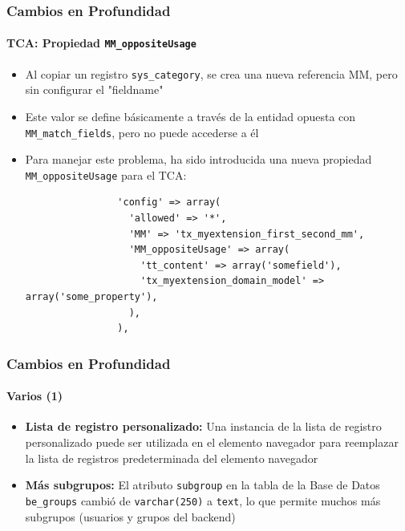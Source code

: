 \begin{frame}[fragile]
	\frametitle{Cambios en Profundidad}
	\framesubtitle{TCA: Propiedad \texttt{MM\_oppositeUsage}}

	\lstset{
		basicstyle=\tiny\ttfamily
	}

	\begin{itemize}
		\item Al copiar un registro \texttt{sys\_category}, se crea una nueva referencia MM, pero sin configurar el "fieldname"
		\item Este valor se define básicamente a través de la entidad opuesta con \texttt{MM\_match\_fields}, pero no puede accederse a él
		\item Para manejar este problema, ha sido introducida una nueva propiedad \texttt{MM\_oppositeUsage} para el TCA:

			\begin{lstlisting}
				'config' => array(
				  'allowed' => '*',
				  'MM' => 'tx_myextension_first_second_mm',
				  'MM_oppositeUsage' => array(
				    'tt_content' => array('somefield'),
				    'tx_myextension_domain_model' => array('some_property'),
				  ),
				),
			\end{lstlisting}

	\end{itemize}

\end{frame}


\begin{frame}[fragile]
	\frametitle{Cambios en Profundidad}
	\framesubtitle{Varios (1)}

	\begin{itemize}

		\item \textbf{Lista de registro personalizado:}\newline
			\small
				Una instancia de la lista de registro personalizado puede ser utilizada en el elemento navegador para reemplazar la lista de registros predeterminada del elemento navegador
			\normalsize

		\item \textbf{Más subgrupos:}\newline
			\small
				El atributo \texttt{subgroup} en la tabla de la Base de Datos \texttt{be\_groups} cambió de \texttt{varchar(250)} a \texttt{text}, lo que permite muchos más subgrupos (usuarios y grupos del backend)
			\normalsize
	\end{itemize}

\end{frame}

